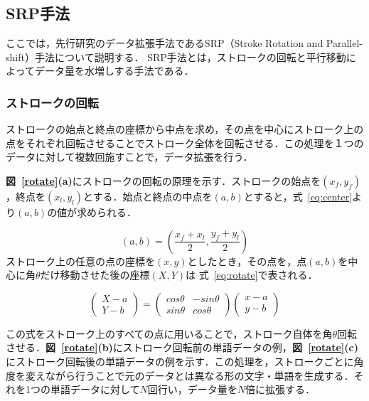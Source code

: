 \subsection{SRP手法}
ここでは，先行研究のデータ拡張手法であるSRP（Stroke Rotation and Parallel-shift）手法について説明する．
SRP手法とは，ストロークの回転と平行移動によってデータ量を水増しする手法である．
\subsubsection{ストロークの回転}
ストロークの始点と終点の座標から中点を求め，その点を中心にストローク上の点をそれぞれ回転させることでストローク全体を回転させる．この処理を１つのデータに対して複数回施すことで，データ拡張を行う．

\textbf{図~\ref{rotate}(a)}にストロークの回転の原理を示す．ストロークの始点を$(x_f, y_f)$，終点を$(x_l, y_l)$とする．始点と終点の中点を$(a, b)$とすると，式~\ref{eq:center}より$(a, b)$の値が求められる．

\begin{equation}
  (a, b) = (\frac{x_f+x_l}{2}, \frac{y_f+y_l}{2})
  \label{eq:center}
\end{equation}
ストローク上の任意の点の座標を$(x, y)$としたとき，その点を，点$(a, b)$を中心に角$\theta$だけ移動させた後の座標$(X, Y)$は 式~\ref{eq:rotate}で表される．

\begin{equation}
  \left(
    \begin{array}{r}
        X-a \\
        Y-b
    \end{array}
    \right)
 = \left(
  \begin{array}{rr}
      cos\theta & -sin\theta \\
      sin\theta & cos\theta
  \end{array}
  \right)
  \left(
    \begin{array}{r}
        x-a \\
        y-b
    \end{array}
    \right)
  \label{eq:rotate}
\end{equation}

この式をストローク上のすべての点に用いることで，ストローク自体を角$\theta$回転させる．\textbf{図~\ref{rotate}(b)}にストローク回転前の単語データの例，\textbf{図~\ref{rotate}(c)}にストローク回転後の単語データの例を示す．この処理を，ストロークごとに角度を変えながら行うことで元のデータとは異なる形の文字・単語を生成する．それを1つの単語データに対して$N$回行い，データ量を$N$倍に拡張する．

